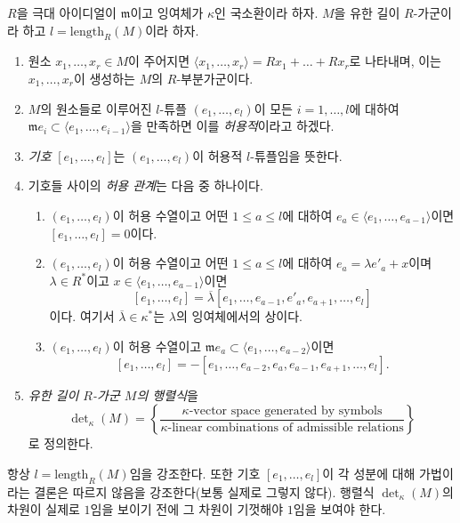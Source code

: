 \begin{definition}
\label{definition-determinant}
$R$을 극대 아이디얼이 $\mathfrak m$이고 잉여체가 $\kappa$인
국소환이라 하자. $M$을 유한 길이 $R$-가군이라 하고
$l = \text{length}_R(M)$이라 하자.
\begin{enumerate}
\item 원소 $x_1, \ldots, x_r \in M$이 주어지면
$\langle x_1, \ldots, x_r \rangle = Rx_1 + \ldots + Rx_r$로
나타내며, 이는 $x_1, \ldots, x_r$이 생성하는 $M$의
$R$-부분가군이다.
\item $M$의 원소들로 이루어진 $l$-튜플 $(e_1, \ldots, e_l)$이
모든 $i = 1, \ldots, l$에 대하여
$\mathfrak m e_i \subset \langle e_1, \ldots, e_{i - 1} \rangle$을
만족하면 이를 {\it 허용적}이라고 하겠다.
\item {\it 기호} $[e_1, \ldots, e_l]$는
$(e_1, \ldots, e_l)$이 허용적 $l$-튜플임을 뜻한다.
\item 기호들 사이의 {\it 허용 관계}는 다음 중 하나이다.
\begin{enumerate}
\item $(e_1, \ldots, e_l)$이 허용 수열이고 어떤
$1 \leq a \leq l$에 대하여
$e_a \in \langle e_1, \ldots, e_{a - 1}\rangle$이면
$[e_1, \ldots, e_l] = 0$이다.
\item $(e_1, \ldots, e_l)$이 허용 수열이고 어떤
$1 \leq a \leq l$에 대하여
$e_a = \lambda e'_a + x$이며 $\lambda \in R^*$이고
$x \in \langle e_1, \ldots, e_{a - 1}\rangle$이면
$$
[e_1, \ldots, e_l] =
\overline{\lambda} [e_1, \ldots, e_{a - 1}, e'_a, e_{a + 1}, \ldots, e_l]
$$
이다. 여기서 $\overline{\lambda} \in \kappa^*$는 $\lambda$의
잉여체에서의 상이다.
\item $(e_1, \ldots, e_l)$이 허용 수열이고
$\mathfrak m e_a \subset \langle e_1, \ldots, e_{a - 2}\rangle$이면
$$
[e_1, \ldots, e_l] =
- [e_1, \ldots, e_{a - 2}, e_a, e_{a - 1}, e_{a + 1}, \ldots, e_l].
$$
\end{enumerate}
\item
{\it 유한 길이 $R$-가군 $M$의 행렬식}을
$$
\det\nolimits_\kappa(M) =
\left\{
\frac{\kappa\text{-vector space generated by symbols}}
{\kappa\text{-linear combinations of admissible relations}}
\right\}
$$
로 정의한다.
\end{enumerate}
\end{definition}

\noindent
항상 $l = \text{length}_R(M)$임을 강조한다. 또한 기호
$[e_1, \ldots, e_l]$이 각 성분에 대해 가법이라는 결론은 따르지
않음을 강조한다(보통 실제로 그렇지 않다). 행렬식
$\det_\kappa(M)$의 차원이 실제로 $1$임을 보이기 전에 그 차원이
기껏해야 $1$임을 보여야 한다.

